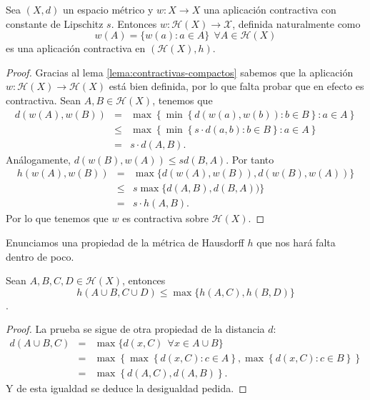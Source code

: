 \begin{lema}
    Sea $(X,d)$ un espacio métrico y $w:X\longrightarrow X$ una aplicación contractiva con constante de Lipschitz $s$. Entonces $w:\mathcal{H}(X)\longrightarrow\mathcal{X}$, definida naturalmente como
    $$
    w(A)=\{w(a):a\in A\}\ \ \forall A\in\mathcal{H}(X)
    $$
    es una aplicación contractiva en $(\mathcal{H}(X),h)$.
\end{lema}
\begin{proof}
    Gracias al lema \ref{lema:contractivas-compactos} sabemos que la aplicación $w:\mathcal{H}(X)\longrightarrow\mathcal{H}(X)$ está bien definida, por lo que falta probar que en efecto es contractiva. Sean $A,B\in\mathcal{H}(X)$, tenemos que
    \begin{eqnarray*}
        d(w(A),w(B)) & = & \max\left\lbrace \min \left\lbrace d(w(a),w(b)): b\in B\right\rbrace : a\in A \right\rbrace \\
                     & \leq &  \max\left\lbrace \min \left\lbrace s\cdot d(a,b): b\in B\right\rbrace : a\in A \right\rbrace \\
                     & = & s\cdot d(A,B).
    \end{eqnarray*}
    Análogamente, $d(w(B),w(A))\leq s d(B,A)$. Por tanto
    \begin{eqnarray*}
        h(w(A),w(B)) & = & \max \{d(w(A),w(B)), d(w(B),w(A))\} \\
                     & \leq & s \max \{d(A,B), d(B,A))\} \\
                     & = & s\cdot h(A,B).
    \end{eqnarray*}
    Por lo que tenemos que $w$ es contractiva sobre $\mathcal{H}(X)$.
\end{proof}

Enunciamos una propiedad de la métrica de Hausdorff $h$ que nos hará falta dentro de poco.

\begin{lema}
    \label{lema:uniones}
    Sean $A,B,C,D\in\mathcal{H}(X)$, entonces 
    $$h(A\cup B, C\cup D)\leq\max\{h(A,C),h(B,D)\}$$.
\end{lema}
\begin{proof}
    La prueba se sigue de otra propiedad de la distancia $d$:
    \begin{eqnarray*}
    d(A\cup B,C) & = & \max\{d(x,C)\ \ \forall x\in A\cup B\} \\
                 & = & \max\left\lbrace \max\left\lbrace d(x,C):c\in A \right\rbrace, \max\left\lbrace d(x,C):c\in B \right\rbrace\right\rbrace \\
                 & = & \max\left\lbrace d(A,C),d(A,B) \right\rbrace.
    \end{eqnarray*}
    Y de esta igualdad se deduce la desigualdad pedida.
\end{proof}

